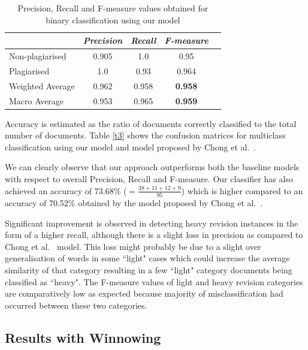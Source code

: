 \documentclass[11pt]{article}
\begin{document}
\begin{table}[htbp]
\small
  \begin{center}
  \begin{tabularx}{\columnwidth}{|X|c|c|c|c|}
    \hline 
    \centering {\em  Class} & {\em  Precision} & {\em  Recall} & {\em  F-measure} \\ 
    \hline 
    \centering Non-plagiarised &  0.905 & 1.0 & 0.95 \\ 
    \hline 
    \centering Plagiarised & 1.0 & 0.93 & 0.964 \\ 
    \hline 
    \centering Weighted Average & 0.962 & 0.958 & \textbf{0.958} \\ 
    \hline 
    \centering Macro Average & 0.953 & 0.965 & \textbf{0.959} \\ 
    \hline 
 \end{tabularx}
 \end{center}
 \caption{Precision, Recall and F-measure values obtained for binary classification using our model}
  \label{t2}
 \end{table}

Accuracy is estimated as the ratio of documents correctly classified to the total number of documents. Table \ref{t3} shows the confusion matrices for multiclass classification using our model and model proposed by Chong et al.~.%

  We can clearly observe that our approach outperforms both the baseline models with respect to overall Precision, Recall and F-measure. Our classifier has also achieved an accuracy of 73.68\% ($= \frac{38+11+12+9}{95}$) which is higher compared to an accuracy of 70.52\% obtained by the model proposed by Chong et al.~.
  
  Significant improvement is observed in detecting heavy revision instances in the form of a higher recall, although there is a slight loss in precision as compared to Chong et al.~ model. This loss might probably be due to a slight over generalisation of words in some ``light" cases which could increase the average similarity of that category resulting in a few ``light" category documents being classified as ``heavy". The F-measure values of light and heavy revision categories are comparatively low as expected because  majority of misclassification had occurred between these two categories. 

\subsection{Results with Winnowing}
\end{document}
